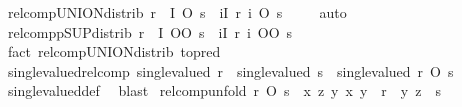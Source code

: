 \begin{isabellebody}
\ relcomp{\isacharunderscore}{\kern0pt}UNION{\isacharunderscore}{\kern0pt}distrib{}{\isacharcolon}{\kern0pt}\ {\isachardoublequoteopen}{\isasymUnion}{\isacharparenleft}{\kern0pt}r\ {\isacharbackquote}{\kern0pt}\ I{\isacharparenright}{\kern0pt}\ O\ s\ {\isacharequal}{\kern0pt}\ {\isacharparenleft}{\kern0pt}{\isasymUnion}i{\isasymin}I{\isachardot}{\kern0pt}\ r\ i\ O\ s{\isacharparenright}{\kern0pt}\ {\isachardoublequoteclose}\isanewline
%
\isadelimproof
\ \ %
\endisadelimproof
%
\isatagproof
{}\isamarkupfalse%
\ auto%
\endisatagproof
{\isafoldproof}%
%
\isadelimproof
\isanewline
%
\endisadelimproof
\isanewline
{}\isamarkupfalse%
\ relcompp{\isacharunderscore}{\kern0pt}SUP{\isacharunderscore}{\kern0pt}distrib{}{\isacharcolon}{\kern0pt}\ {\isachardoublequoteopen}{\isasymSqunion}{\isacharparenleft}{\kern0pt}r\ {\isacharbackquote}{\kern0pt}\ I{\isacharparenright}{\kern0pt}\ OO\ s\ {\isacharequal}{\kern0pt}\ {\isacharparenleft}{\kern0pt}{\isasymSqunion}i{\isasymin}I{\isachardot}{\kern0pt}\ r\ i\ OO\ s{\isacharparenright}{\kern0pt}{\isachardoublequoteclose}\isanewline
%
\isadelimproof
\ \ %
\endisadelimproof
%
\isatagproof
{}\isamarkupfalse%
\ {\isacharparenleft}{\kern0pt}fact\ relcomp{\isacharunderscore}{\kern0pt}UNION{\isacharunderscore}{\kern0pt}distrib{}\ {\isacharbrackleft}{\kern0pt}to{\isacharunderscore}{\kern0pt}pred{\isacharbrackright}{\kern0pt}{\isacharparenright}{\kern0pt}%
\endisatagproof
{\isafoldproof}%
%
\isadelimproof
\isanewline
%
\endisadelimproof
\ \ \ \ \isanewline
{}\isamarkupfalse%
\ single{\isacharunderscore}{\kern0pt}valued{\isacharunderscore}{\kern0pt}relcomp{\isacharcolon}{\kern0pt}\ {\isachardoublequoteopen}single{\isacharunderscore}{\kern0pt}valued\ r\ {\isasymLongrightarrow}\ single{\isacharunderscore}{\kern0pt}valued\ s\ {\isasymLongrightarrow}\ single{\isacharunderscore}{\kern0pt}valued\ {\isacharparenleft}{\kern0pt}r\ O\ s{\isacharparenright}{\kern0pt}{\isachardoublequoteclose}\isanewline
%
\isadelimproof
\ \ %
\endisadelimproof
%
\isatagproof
{}\isamarkupfalse%
\ single{\isacharunderscore}{\kern0pt}valued{\isacharunderscore}{\kern0pt}def\ \isamarkupfalse%
\ blast%
\endisatagproof
{\isafoldproof}%
%
\isadelimproof
\isanewline
%
\endisadelimproof
\isanewline
{}\isamarkupfalse%
\ relcomp{\isacharunderscore}{\kern0pt}unfold{\isacharcolon}{\kern0pt}\ {\isachardoublequoteopen}r\ O\ s\ {\isacharequal}{\kern0pt}\ {\isacharbraceleft}{\kern0pt}{\isacharparenleft}{\kern0pt}x{\isacharcomma}{\kern0pt}\ z{\isacharparenright}{\kern0pt}{\isachardot}{\kern0pt}\ {\isasymexists}y{\isachardot}{\kern0pt}\ {\isacharparenleft}{\kern0pt}x{\isacharcomma}{\kern0pt}\ y{\isacharparenright}{\kern0pt}\ {\isasymin}\ r\ {\isasymand}\ {\isacharparenleft}{\kern0pt}y{\isacharcomma}{\kern0pt}\ z{\isacharparenright}{\kern0pt}\ {\isasymin}\ s{\isacharbraceright}{\kern0pt}{\isachardoublequoteclose}\isanewline

\end{isabellebody}
